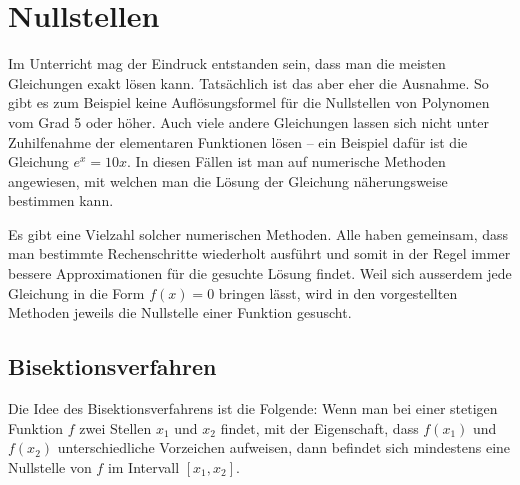 \section{Nullstellen}
Im Unterricht mag der Eindruck entstanden sein, dass man die meisten Gleichungen exakt lösen kann. Tatsächlich ist das aber eher die Ausnahme. So gibt es zum Beispiel keine Auflösungsformel für die Nullstellen von Polynomen vom Grad 5 oder höher. Auch viele andere Gleichungen lassen sich nicht unter Zuhilfenahme der elementaren Funktionen lösen – ein Beispiel dafür ist die Gleichung $e^x=10x$. In diesen Fällen ist man auf numerische Methoden angewiesen, mit welchen man die Lösung der Gleichung näherungsweise bestimmen kann.

Es gibt eine Vielzahl solcher numerischen Methoden. Alle haben gemeinsam, dass man bestimmte Rechenschritte wiederholt ausführt und somit in der Regel immer bessere Approximationen für die gesuchte Lösung findet. Weil sich ausserdem jede Gleichung in die Form $f(x) = 0$ bringen lässt, wird in den vorgestellten Methoden jeweils die Nullstelle einer Funktion gesuscht.

\subsection{Bisektionsverfahren}
Die Idee des Bisektionsverfahrens ist die Folgende: Wenn man bei einer stetigen Funktion $f$ zwei Stellen $x_1$ und $x_2$ findet, mit der Eigenschaft, dass $f(x_1)$ und $f(x_2)$ unterschiedliche Vorzeichen aufweisen, dann befindet sich mindestens eine Nullstelle von $f$ im Intervall $[x_1, x_2]$.

